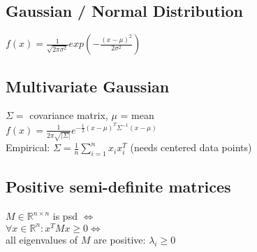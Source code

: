 \subsection*{Gaussian / Normal Distribution}
$f(x) = \frac{1}{\sqrt{2\pi\sigma^2}} exp(-\frac{(x-\mu)^2}{2\sigma^2})$

\subsection*{Multivariate Gaussian}
$\Sigma =$ covariance matrix, $\mu$ = mean\\
$f(x) = \frac{1}{2\pi \sqrt{|\Sigma|}} e^{- \frac{1}{2} (x-\mu)^T \Sigma^{-1} (x-\mu)}$\\
Empirical: $\Sigma = \frac{1}{n}\sum_{i=1}^n x_i x_i^T$ (needs centered data points)

\subsection*{Positive semi-definite matrices}
$M \in \mathbb{R}^{n\times n}$ is psd $\Leftrightarrow$\\
$\forall x \in \mathbb{R}^n: x^TMx \geq 0 \Leftrightarrow$\\
all eigenvalues of $M$ are positive: $\lambda_i\geq 0$


